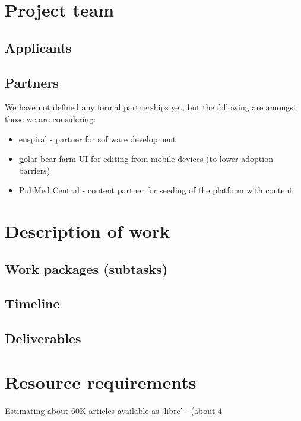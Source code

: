 \documentclass[final,authoryear,3p]{elsarticle-open-drafting}
\begin{document}
\section{Project team}
\subsection{Applicants}
\subsection{Partners}
We have not defined any formal partnerships yet, but the following are amongst those we are considering:
\begin{itemize}
	\item \href{http://www.enspiral.com}{enspiral} - partner for software development
        \item \href{http://www.sensemedical.co.nz/} polar bear farm UI for editing from mobile devices (to lower adoption barriers)
	\item \href{http://www.ncbi.nlm.nih.gov/pmc/}{PubMed Central} - content partner for seeding of the platform with content
	
\end{itemize}

\section{Description of work}
\subsection{Work packages (subtasks)}
\subsection{Timeline}
\subsection{Deliverables}

\section{Resource requirements}
Estimating about 60K articles available as 'libre' - (about 4%
\end{document}
